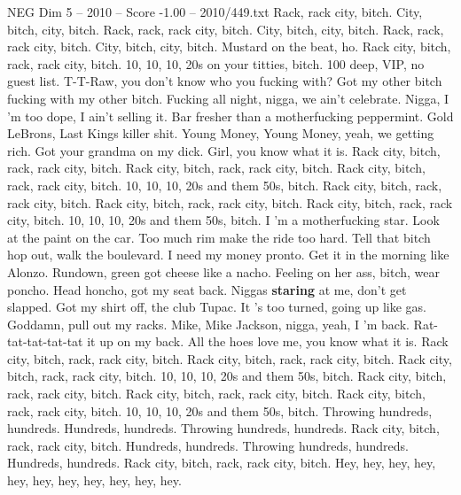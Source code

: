 \begin{textsample}{NEG Dim 5 – 2010 – Score -1.00 – 2010/449.txt}  \label{ex:f5_neg_018}
Rack, rack city, bitch.
City, bitch, city, bitch.
Rack, rack, rack city, bitch.
City, bitch, city, bitch.
Rack, rack, rack city, bitch.
City, bitch, city, bitch.
Mustard on the beat, ho.
Rack city, bitch, rack, rack city, bitch. 10, 10, 10, 20s on your titties, bitch. 100 deep, VIP, no guest list.
T-T-Raw, you don't know who you fucking with?
Got my other bitch fucking with my other bitch.
Fucking all night, nigga, we ain't celebrate.
Nigga, I 'm too dope, I ain't selling it.
Bar fresher than a motherfucking peppermint.
Gold LeBrons, Last Kings killer shit.
Young Money, Young Money, yeah, we getting rich.
Got your grandma on my dick.
Girl, you know what it is.
Rack city, bitch, rack, rack city, bitch.
Rack city, bitch, rack, rack city, bitch.
Rack city, bitch, rack, rack city, bitch. 10, 10, 10, 20s and them 50s, bitch.
Rack city, bitch, rack, rack city, bitch.
Rack city, bitch, rack, rack city, bitch.
Rack city, bitch, rack, rack city, bitch. 10, 10, 10, 20s and them 50s, bitch.
I 'm a motherfucking star.
Look at the paint on the car.
Too much rim make the ride too hard.
Tell that bitch hop out, walk the boulevard.
I need my money pronto.
Get it in the morning like Alonzo.
Rundown, green got cheese like a nacho.
Feeling on her ass, bitch, wear poncho.
Head honcho, got my seat back.
Niggas \textbf{staring} at me, don't get slapped.
Got my shirt off, the club Tupac.
It 's too turned, going up like gas.
Goddamn, pull out my racks.
Mike, Mike Jackson, nigga, yeah, I 'm back.
Rat-tat-tat-tat-tat it up on my back.
All the hoes love me, you know what it is.
Rack city, bitch, rack, rack city, bitch.
Rack city, bitch, rack, rack city, bitch.
Rack city, bitch, rack, rack city, bitch. 10, 10, 10, 20s and them 50s, bitch.
Rack city, bitch, rack, rack city, bitch.
Rack city, bitch, rack, rack city, bitch.
Rack city, bitch, rack, rack city, bitch. 10, 10, 10, 20s and them 50s, bitch.
Throwing hundreds, hundreds.
Hundreds, hundreds.
Throwing hundreds, hundreds.
Rack city, bitch, rack, rack city, bitch.
Hundreds, hundreds.
Throwing hundreds, hundreds.
Hundreds, hundreds.
Rack city, bitch, rack, rack city, bitch.
Hey, hey, hey, hey, hey, hey, hey, hey, hey, hey, hey.

\end{textsample}
